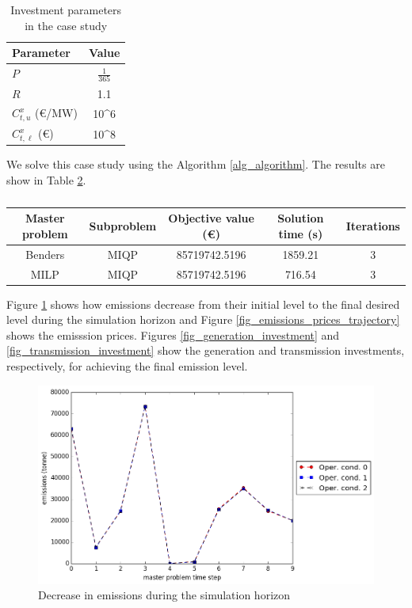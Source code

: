 \documentclass[final]{IEEEtran}
\begin{document}
\begin{table}[htpb]
\centering
\begin{tabular}{l| c} \hline
Parameter 				& Value  \\ \hline
$P$ 					& $\frac{1}{365}$ \\
$R$						& 1.1		\\
$C^x_{t, u}$ (€/MW)		& 10^6    \\
$C^x_{t, \ell}$ (€)		& 10^8	\\
\end{tabular}
\caption{Investment parameters in the case study}
\label{table_investment_parameters}
\end{table}

We solve this case study using the Algorithm \ref{alg_algorithm}. The results are show in Table \ref{table_results}.

\begin{table}[htpb]
\centering
\begin{tabular}{c c| c c c} \hline
Master problem 			& Subproblem & Objective value (€) 	& Solution time (s) 	& Iterations \\ \hline
Benders					& MIQP 				& 85719742.5196 		& 1859.21				& 3				 \\
MILP					& MIQP 				& 85719742.5196 		& 716.54				& 3				 \\
\end{tabular}
\caption{}
\label{table_results}
\end{table}

Figure \ref{fig_emissions_trajectory} shows how emissions decrease from their initial level to the final desired level during the simulation horizon and Figure \ref{fig_emissions_prices_trajectory} shows the emisssion prices. Figures \ref{fig_generation_investment} and \ref{fig_transmission_investment} show the generation and transmission investments, respectively, for achieving the final emission level.

\begin{figure}[htpb]
  \centering
  \includegraphics[width=\linewidth]{emissions_trajectory_milp_dc_miqp_dc.png}
  \caption{Decrease in emissions during the simulation horizon}
  \label{fig_emissions_trajectory}
\end{figure}
\end{document}

